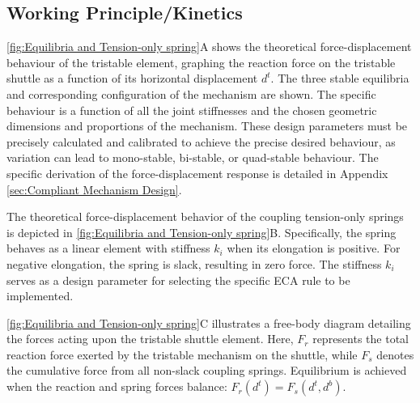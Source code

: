 \subsection*{Working Principle/Kinetics}

\autoref*{fig:Equilibria and Tension-only spring}A shows the theoretical force-displacement behaviour of the tristable element, graphing the reaction force on the tristable shuttle as a function of its horizontal displacement \(d^t\). The three stable equilibria and corresponding configuration of the mechanism are shown. 
The specific behaviour is a function of all the joint stiffnesses and the chosen geometric dimensions and proportions of the mechanism. These design parameters must be precisely calculated and calibrated to achieve the precise desired behaviour, as variation can lead to mono-stable, bi-stable, or quad-stable behaviour. The specific derivation of the force-displacement response is detailed in Appendix \ref*{sec:Compliant Mechanism Design}.


The theoretical force-displacement behavior of the coupling tension-only springs is depicted in \autoref*{fig:Equilibria and Tension-only spring}B. Specifically, the spring behaves as a linear element with stiffness \( k_i \) when its elongation is positive. For negative elongation, the spring is slack, resulting in zero force. The stiffness \( k_i \) serves as a design parameter for selecting the specific ECA rule to be implemented.

\autoref*{fig:Equilibria and Tension-only spring}C illustrates a free-body diagram detailing the forces acting upon the tristable shuttle element. Here, \( F_r \) represents the total reaction force exerted by the tristable mechanism on the shuttle, while \( F_s \) denotes the cumulative force from all non-slack coupling springs. Equilibrium is achieved when the reaction and spring forces balance: \( F_r(d^t) = F_s(d^t, d^b) \). 

